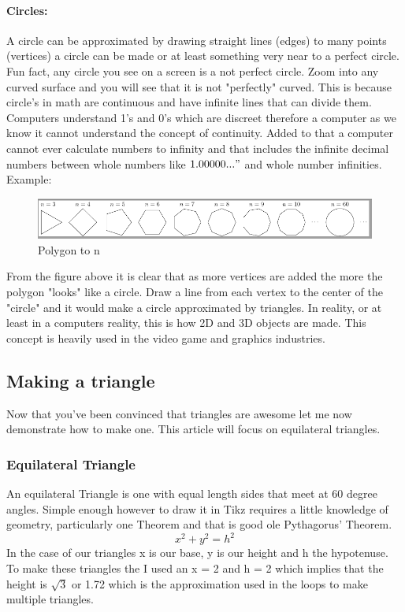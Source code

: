 \documentclass[11pt]{article}
\begin{document}
\paragraph{Circles:}
A circle can be approximated by drawing straight lines (edges) to many points (vertices) a circle can be 
made or at least something very near to a perfect circle. Fun fact, any circle you see on a screen is a
not perfect circle. Zoom into any curved surface and you will see that it is not "perfectly" curved. This
is because circle's in math are continuous and have infinite lines that can divide them. Computers understand 1's and
0's which are discreet therefore a computer as we know it cannot understand the concept of continuity. 
Added to that a computer cannot ever calculate numbers to infinity and that includes the infinite decimal numbers between
whole numbers like $1.00000..."$ and whole number infinities. Example:

\begin{center}
	\begin{figure}[H]
		\includegraphics[width=5in]{drW_ngons}
		\caption{Polygon to n}
	\end{figure}
\end{center}

From the figure above it is clear that as more vertices are added the more the polygon "looks" like a circle.
Draw a line from each vertex to the center of the "circle" and it would make a circle approximated by triangles.
In reality, or at least in a computers reality, this is how 2D and 3D objects are made. This concept is heavily
used in the video game and graphics industries.

\subsection{Making a triangle}
Now that you've been convinced that triangles are awesome let me now demonstrate how to make one.
This article will focus on equilateral triangles.
\subsubsection{Equilateral Triangle}
An equilateral Triangle is one with equal length sides that meet at 60 degree angles. Simple 
enough however to draw it in Tikz requires a little knowledge of geometry, particularly one 
Theorem and that is good ole Pythagorus' Theorem.
\begin{displaymath}\label{Pythag}
x^2 + y^2 = h^2
\end{displaymath}
In the case of our triangles x is our base, y is our height and h the hypotenuse. To make
these triangles the I used an x = 2 and h = 2 which implies that the height is $\sqrt{3}$ or
1.72 which is the approximation used in the loops to make multiple triangles.
\end{document}
